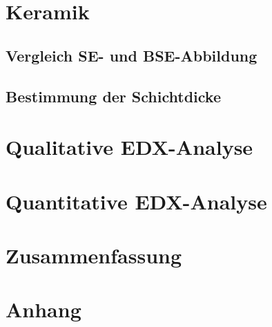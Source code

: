 \documentclass[12pt,english,ngerman]{scrartcl}
\begin{document}
\section{Keramik}


\subsection{Vergleich SE- und BSE-Abbildung}


\subsection{Bestimmung der Schichtdicke}


\section{Qualitative EDX-Analyse}


\section{Quantitative EDX-Analyse}


\section{Zusammenfassung}


\section{Anhang}





\newpage

\printbibliography
\end{document}
